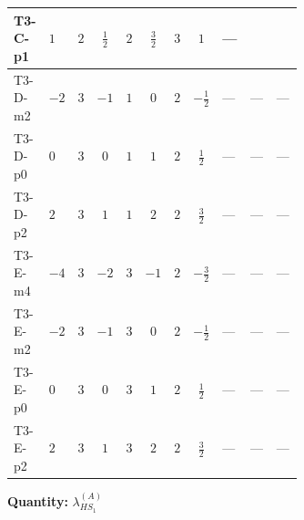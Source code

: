 \documentclass[8pt]{article}
\begin{document}
\begin{landscape}
\begin{longtable}{@{}llcccccc >{\raggedright\arraybackslash}p{0.21\linewidth} >{\raggedright\arraybackslash}p{0.21\linewidth} >{\raggedright\arraybackslash}p{0.21\linewidth}@{}}
\midrule
T3-C-p1 & $1$ & $2$ & $\frac{1}{2}$ & $2$ & $\frac{3}{2}$ & $3$ & $1$ & --- & \scriptsize\adjustbox{max width=\linewidth}{$\begin{gathered} -9 {g_2}^2 {\lambda_{HS_1}^{(A)}}\end{gathered}$} & \scriptsize\adjustbox{max width=\linewidth}{$\begin{gathered} +{\lambda_{12}^{(A)}} {\lambda_{HS_2}^{(A)}}\end{gathered}$} \\
\midrule
T3-D-m2 & $-2$ & $3$ & $-1$ & $1$ & $0$ & $2$ & $-\frac{1}{2}$ & --- & --- & --- \\
\midrule
T3-D-p0 & $0$ & $3$ & $0$ & $1$ & $1$ & $2$ & $\frac{1}{2}$ & --- & --- & --- \\
\midrule
T3-D-p2 & $2$ & $3$ & $1$ & $1$ & $2$ & $2$ & $\frac{3}{2}$ & --- & --- & --- \\
\midrule
T3-E-m4 & $-4$ & $3$ & $-2$ & $3$ & $-1$ & $2$ & $-\frac{3}{2}$ & --- & --- & --- \\
\midrule
T3-E-m2 & $-2$ & $3$ & $-1$ & $3$ & $0$ & $2$ & $-\frac{1}{2}$ & --- & --- & --- \\
\midrule
T3-E-p0 & $0$ & $3$ & $0$ & $3$ & $1$ & $2$ & $\frac{1}{2}$ & --- & --- & --- \\
\midrule
T3-E-p2 & $2$ & $3$ & $1$ & $3$ & $2$ & $2$ & $\frac{3}{2}$ & --- & --- & --- \\
\midrule
\bottomrule
\end{longtable}
\clearpage
\noindent\textbf{Quantity: }$\lambda_{HS_1}^{(A)}$\par\smallskip

\end{landscape}
\end{document}
